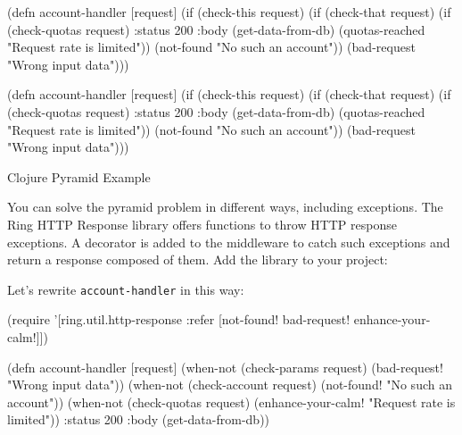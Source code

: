 \begin{listing}[ht!]

\ifx\DEVICETYPE\MOBILE

\begin{clojure}
(defn account-handler [request]
  (if (check-this request)
    (if (check-that request)
      (if (check-quotas request)
        {:status 200
         :body (get-data-from-db)}
        (quotas-reached
          "Request rate is limited"))
      (not-found "No such an account"))
    (bad-request "Wrong input data")))
\end{clojure}

\else

\begin{clojure}
(defn account-handler [request]
  (if (check-this request)
    (if (check-that request)
      (if (check-quotas request)
        {:status 200
         :body (get-data-from-db)}
        (quotas-reached "Request rate is limited"))
      (not-found "No such an account"))
    (bad-request "Wrong input data")))
\end{clojure}

\fi

\caption{Clojure Pyramid Example}
\label{fig:clj-pyramid}

\end{listing}


You can solve the pyramid problem in different ways, including exceptions. The Ring HTTP Response library offers functions to throw HTTP response exceptions. A decorator is added to the middleware to catch such exceptions and return a response composed of them. Add the library to your project:

\begin{clojure}
\end{clojure}

Let's rewrite \verb|account-handler| in this way:


\ifx\DEVICETYPE\MOBILE

\begin{clojure}
(require '[ring.util.http-response
           :refer [not-found!
                   bad-request!
                   enhance-your-calm!]])

(defn account-handler [request]
  (when-not (check-params request)
    (bad-request! "Wrong input data"))
  (when-not (check-account request)
    (not-found! "No such an account"))
  (when-not (check-quotas request)
    (enhance-your-calm!
      "Request rate is limited"))
  {:status 200
   :body (get-data-from-db)})
\end{clojure}

